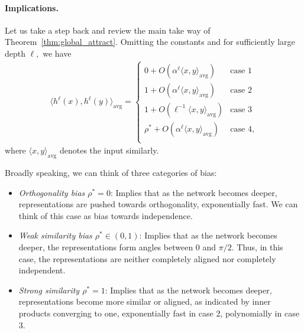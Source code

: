 \documentclass[twoside]{article}
\newcommand{\avg}{\text{avg}}
\theoremstyle{definition}
\begin{document}
\paragraph{Implications.}  Let us take a step back and review the main take way of Theorem~\ref{thm:global_attract}. Omitting the constants and for sufficiently large depth $\ell,$ we have 
\begin{align*}
    \langle h^{\ell}(x), h^{\ell}(y)\rangle_\avg =  \begin{cases}
          0+ O(\alpha ^ \ell \langle x, y \rangle_\avg)  & \text{case 1}\\
         1 + O(\alpha ^ \ell \langle x, y \rangle_\avg)  & \text{case 2}\\
         1 + O \left(\ell^{-1}\langle x, y \rangle_\avg \right)   & \text{case 3}\\
         \rho^* + O(\alpha ^ \ell \langle x, y \rangle_\avg)  & \text{case 4},\\
    \end{cases}
\end{align*}
where $\langle x,y\rangle_\avg $ denotes the input similarly. 

Broadly speaking, we can think of three categories of bias:

\begin{itemize}
    \item \textit{Orthogonality bias $\rho^*=0$}: Implies that as the network becomes deeper, representations are pushed towards orthogonality, exponentially fast. We can think of this case as bias towards independence. 
    \item \textit{Weak similarity bias $\rho^*\in (0,1)$}: Implies that as the network becomes deeper, the representations form angles between $0$ and $\pi/2.$ Thus, in this case, the representations are neither completely aligned nor completely independent. 
    \item \textit{Strong similarity $\rho^*=1$}: Implies that as the network becomes deeper, representations become more similar or aligned, as indicated by inner products converging to one, exponentially fast in case 2, polynomially in case 3. 
\end{itemize}
\end{document}
